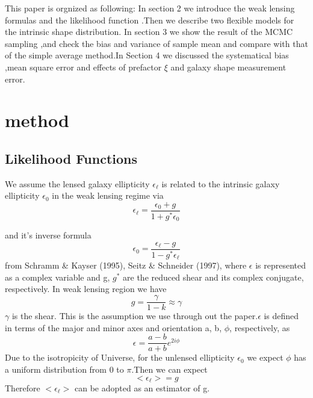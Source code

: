 \documentclass[useAMS,usenatbib]{mn2e}
\begin{document}
This paper is orgnized as following: In section 2 we introduce the
weak lensing formulas and the likelihood function .Then we describe
two flexible models for the intrinsic shape distribution. In section
3 we show the result of the MCMC sampling ,and check the bias and
variance of sample mean and compare with that of the simple average
method.In Section 4 we discussed the systematical bias ,mean square error
and effects of prefactor $\xi$ and galaxy shape measurement error.




\section{method}

\label{sec:XXX}


\subsection{Likelihood Functions}

We assume the lensed galaxy ellipticity $\epsilon_{\ell}$ is related
to the intrinsic galaxy ellipticity $\epsilon_{0}$ in the weak lensing
regime via 
\begin{equation}
\epsilon_{\ell}=\frac{\epsilon_{0}+g}{1+g^{*}\epsilon_{0}}
\end{equation}


and it's inverse formula 
\begin{equation}
\epsilon_{0}=\frac{\epsilon_{\ell}-g}{1-g^{*}\epsilon_{\ell}}
\end{equation}
from Schramm \& Kayser (1995), Seitz \& Schneider (1997), where $\epsilon$
is represented as a complex variable and g, $g^{*}$ are the reduced
shear and its complex conjugate, respectively. In weak lensing region we have 
\begin{equation}
g=\frac{\gamma}{1-k}\approx\gamma
\end{equation}
$\gamma$ is the shear. This is the assumption we use through out
the paper.$\epsilon$ is defined in terms of the major and minor axes and orientation a, b, $\phi$,
respectively, as
\begin{equation}
\epsilon=\frac{a-b}{a+b}e^{2i\phi}
\end{equation}
Due to the isotropicity of Universe, for the unlensed ellipticity $\epsilon_{0}$ 
we expect $\phi$ has a uniform distribution
from 0 to $\pi$.Then we can expect 
\begin{equation}
<\epsilon_{\ell}>=g
\end{equation}
Therefore $<\epsilon_{\ell}>$ can be adopted as an estimator of g.
\end{document}
